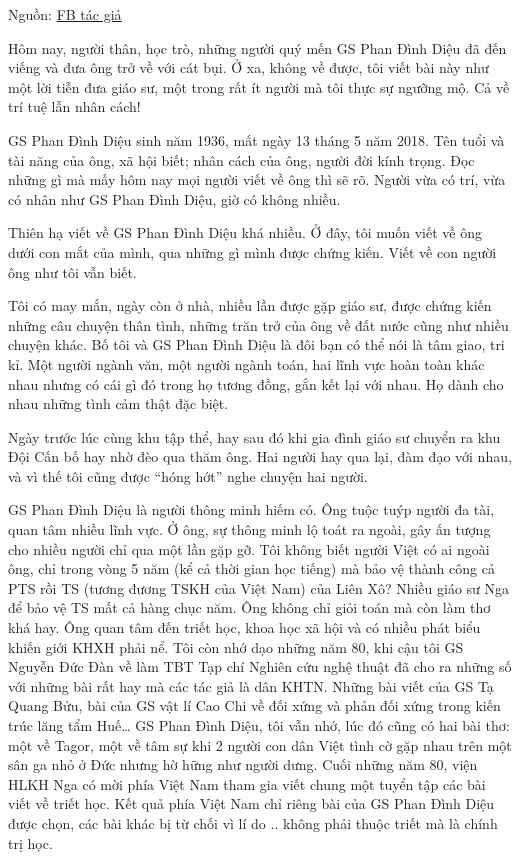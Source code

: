 Nguồn: \href{https://www.facebook.com/notes/642263246455963/}{FB tác giả}

Hôm nay, người thân, học trò, những người quý mến GS Phan Đình Diệu đã đến viếng và đưa ông trở về với cát bụi. Ở xa, không về được, tôi viết bài này như một lời tiễn đưa giáo sư,  một trong rất ít người mà tôi thực sự ngưỡng mộ. Cả về trí tuệ lẫn nhân cách!

 

GS Phan Đình Diệu sinh năm 1936, mất ngày 13 tháng 5 năm 2018. Tên tuổi và tài năng của ông, xã hội biết; nhân cách của ông, người đời kính trọng. Đọc những gì mà mấy hôm nay mọi người viết về ông thì sẽ rõ. Người vừa có trí, vừa có nhân như GS Phan Đình Diệu, giờ có không nhiều.

 

Thiên hạ viết về GS Phan Đình Diệu khá nhiều. Ở đây, tôi muốn viết về ông dưới con mắt của mình, qua những gì mình được chứng kiến. Viết về con người ông như tôi vẫn biết.

 

Tôi có may mắn, ngày còn ở nhà, nhiều lần được gặp giáo sư, được chứng kiến những câu chuyện thân tình, những trăn trở của ông  về đất nước cũng như nhiều chuyện khác. Bố tôi và GS Phan Đình Diệu là đôi bạn có thể nói là tâm giao, tri kỉ. Một người ngành văn, một người ngành toán, hai lĩnh vực hoàn toàn khác nhau nhưng có cái gì đó trong họ tương đồng, gắn kết lại với nhau. Họ dành cho nhau những tình cảm thật đặc biệt. 

 

Ngày trước lúc cùng khu tập thể, hay sau đó khi gia đình giáo sư chuyển ra khu Đội Cấn bố hay nhờ đèo qua thăm ông. Hai người hay qua lại, đàm đạo với nhau, và vì thế tôi cũng được “hóng hớt” nghe chuyện hai người.

 

GS Phan Đình Diệu là người thông minh hiếm có. Ông tuộc tuýp người đa tài, quan tâm nhiều lĩnh vực. Ở ông, sự thông minh lộ toát ra ngoài, gây ấn tượng cho nhiều người chỉ qua một lần gặp gỡ. Tôi không biết người Việt có ai ngoài ông, chỉ trong vòng 5 năm (kể cả thời gian học tiếng) mà bảo vệ thành công cả PTS rồi TS (tương đương TSKH của Việt Nam) của Liên Xô? Nhiều giáo sư Nga để bảo vệ TS mất cả hàng chục năm. Ông không chỉ giỏi toán mà còn làm thơ khá hay. Ông quan tâm đến triết học, khoa học xã hội và có nhiều phát biểu khiến giới KHXH phải nể. Tôi còn nhớ dạo những năm 80, khi cậu tôi GS Nguyễn Đức Đàn về làm TBT Tạp chí Nghiên cứu nghệ thuật đã cho ra những số với những bài rất hay mà các tác giả là dân KHTN. Những bài viết của GS Tạ Quang Bửu, bài của GS vật lí Cao Chi về đối xứng và phản đối xứng trong kiến trúc lăng tẩm Huế… GS Phan Đình Diệu, tôi vẫn nhớ, lúc đó cũng có hai bài thơ: một về Tagor, một về tâm sự khi 2 người con dân Việt tình cờ gặp nhau trên một sân ga nhỏ ở Đức nhưng hờ hững như người dưng. Cuối những năm 80, viện HLKH Nga có mời phía Việt Nam tham gia viết chung một tuyển tập các bài viết về triết học. Kết quả phía Việt Nam chỉ riêng bài của GS Phan Đình Diệu được chọn, các bài khác bị từ chối vì lí do .. không phải thuộc triết mà là chính trị học.

